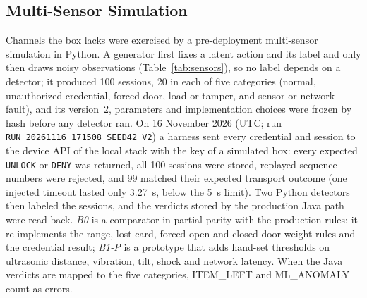 \documentclass[manuscript,screen]{acmart}
\begin{document}
\subsection{Multi-Sensor Simulation}\label{sec:sim_eval}

Channels the box lacks were exercised by a pre-deployment multi-sensor simulation in Python. A generator first fixes a
latent action and its label and only then draws noisy observations (Table~\ref{tab:sensors}), so no label depends on a
detector; it produced 100 sessions, 20 in each of five categories (normal, unauthorized credential, forced door, load or
tamper, and sensor or network fault), and its version~2, parameters and implementation choices were frozen by hash
before any detector ran. On 16 November 2026 (UTC; run \texttt{RUN\_20261116\_171508\_SEED42\_V2}) a harness sent every
credential and session to the device API of the local stack with the key of a simulated box: every expected
\texttt{UNLOCK} or \texttt{DENY} was returned, all 100 sessions were stored, replayed sequence numbers were rejected,
and 99 matched their expected transport outcome (one injected timeout lasted only 3.27~s, below the 5~s limit). Two
Python detectors then labeled the sessions, and the verdicts stored by the production Java path were read back.
\emph{B0} is a comparator in partial parity with the production rules: it re-implements the range, lost-card,
forced-open and closed-door weight rules and the credential result; \emph{B1-P} is a prototype that adds hand-set
thresholds on ultrasonic distance, vibration, tilt, shock and network latency. When the Java verdicts are mapped to the
five categories, ITEM\_LEFT and ML\_ANOMALY count as errors.
\end{document}

